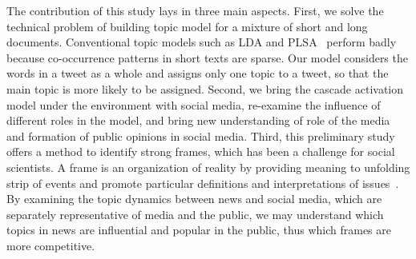 The contribution of this study lays in three main aspects. First, we solve the technical problem of building topic model for a mixture of short and long documents. Conventional topic models such as LDA and PLSA~\cite{hofmann1999probabilistic} perform badly because co-occurrence patterns in short texts are sparse. Our model considers the words in a tweet as a whole and assigns only one topic to a tweet, so that the main topic is more likely to be assigned.
Second, we bring the cascade activation model under the environment with social media, re-examine the influence of different roles in the model, and bring new understanding of role of the media and formation of public opinions in social media.
Third, this preliminary study offers a method to identify strong frames, which has been a challenge for social scientists. A frame is an organization of reality by providing meaning to unfolding strip of events and promote particular definitions and interpretations of issues~\cite{chong2007framing}. By examining the topic dynamics between news and social media, which are separately representative of media and the public, we may understand which
topics in news are influential and popular in the public, thus which frames are more competitive.
